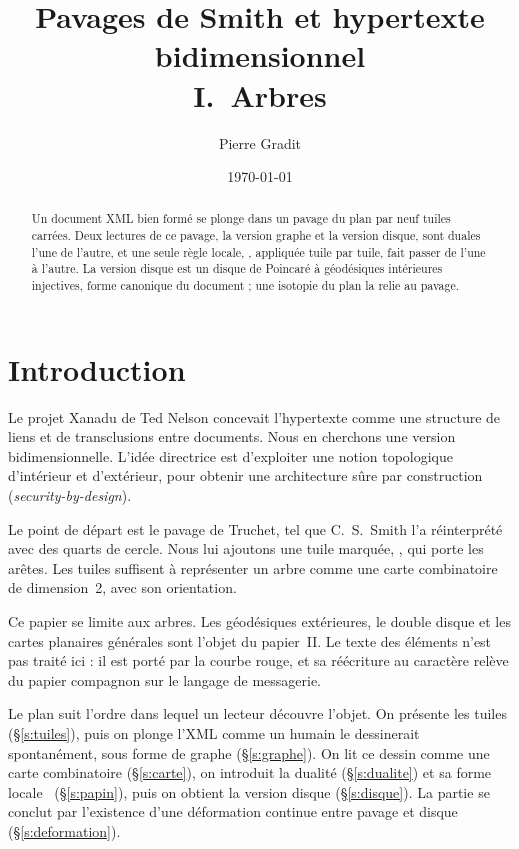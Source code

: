 \documentclass[11pt,a4paper]{article}
\title{Pavages de Smith et hypertexte bidimensionnel\\[.3em]
       \large I.~Arbres}
\author{Pierre Gradit}
\date{\today}
\theoremstyle{remark}
\begin{document}
\maketitle

\begin{abstract}
Un document XML bien formé se plonge dans un pavage du plan par neuf tuiles
carrées. Deux lectures de ce pavage, la version graphe et la version disque,
sont duales l'une de l'autre, et une seule règle locale, \papin, appliquée tuile
par tuile, fait passer de l'une à l'autre. La version disque est un disque de
Poincaré à géodésiques intérieures injectives, forme canonique du document ; une
isotopie du plan la relie au pavage.
\end{abstract}

\section*{Introduction}

Le projet Xanadu de Ted Nelson concevait l'hypertexte comme une structure de
liens et de transclusions entre documents. Nous en cherchons une version
bidimensionnelle. L'idée directrice est d'exploiter une notion topologique
d'intérieur et d'extérieur, pour obtenir une architecture sûre par construction
(\emph{security-by-design}).

Le point de départ est le pavage de Truchet, tel que C.~S.~Smith l'a
réinterprété avec des quarts de cercle. Nous lui ajoutons une tuile marquée,
\CONNECT, qui porte les arêtes. Les tuiles suffisent à représenter un arbre
comme une carte combinatoire de dimension~2, avec son orientation.

Ce papier se limite aux arbres. Les géodésiques extérieures, le double disque et
les cartes planaires générales sont l'objet du papier~II. Le texte des éléments
n'est pas traité ici : il est porté par la courbe rouge, et sa réécriture au
caractère relève du papier compagnon sur le langage de messagerie.

Le plan suit l'ordre dans lequel un lecteur découvre l'objet. On présente les
tuiles (§\ref{s:tuiles}), puis on plonge l'XML comme un humain le dessinerait
spontanément, sous forme de graphe (§\ref{s:graphe}). On lit ce dessin comme une
carte combinatoire (§\ref{s:carte}), on introduit la dualité (§\ref{s:dualite})
et sa forme locale \papin\ (§\ref{s:papin}), puis on obtient la version disque
(§\ref{s:disque}). La partie se conclut par l'existence d'une déformation
continue entre pavage et disque (§\ref{s:deformation}).
\end{document}
